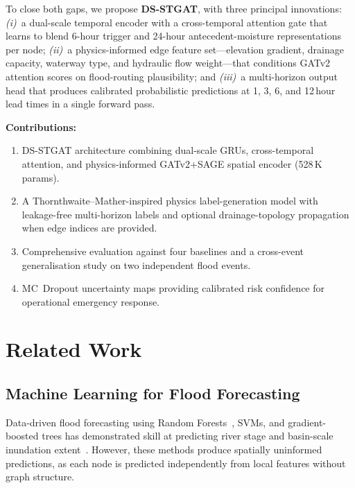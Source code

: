 \documentclass[10pt,twocolumn]{article}
\begin{document}
To close both gaps, we propose \textbf{DS-STGAT}, with three principal
innovations:
\emph{(i)}~a dual-scale temporal encoder with a cross-temporal attention gate
that learns to blend 6-hour trigger and 24-hour antecedent-moisture
representations per node;
\emph{(ii)}~a physics-informed edge feature set---elevation gradient, drainage
capacity, waterway type, and hydraulic flow weight---that conditions
GATv2~\cite{brody2022} attention scores on flood-routing plausibility; and
\emph{(iii)}~a multi-horizon output head that produces calibrated probabilistic
predictions at 1, 3, 6, and 12\,hour lead times in a single forward pass.

\noindent\textbf{Contributions:}
\begin{enumerate}[leftmargin=*, itemsep=1pt, topsep=2pt]
  \item DS-STGAT architecture combining dual-scale GRUs, cross-temporal
        attention, and physics-informed GATv2+SAGE spatial encoder (528\,K params).
    \item A Thornthwaite--Mather-inspired physics label-generation model with
      leakage-free multi-horizon labels and optional drainage-topology
      propagation when edge indices are provided.
  \item Comprehensive evaluation against four baselines and a cross-event
        generalisation study on two independent flood events.
  \item MC~Dropout uncertainty maps providing calibrated risk confidence for
        operational emergency response.
\end{enumerate}

\section{Related Work}
\label{sec:related}

\subsection{Machine Learning for Flood Forecasting}

Data-driven flood forecasting using Random Forests~\cite{breiman2001},
SVMs, and gradient-boosted trees has demonstrated skill at predicting river
stage and basin-scale inundation extent~\cite{mosavi2018}.
However, these methods produce spatially uninformed predictions, as each
node is predicted independently from local features without graph structure.
\end{document}
